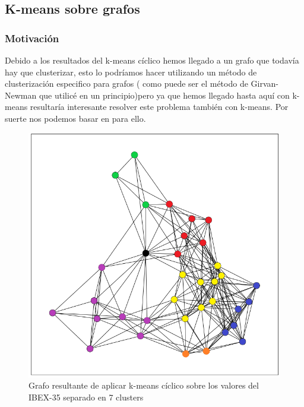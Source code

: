 \documentclass[12pt,a4paper]{article}
\begin{document}
			\subsection{K-means sobre grafos}
			\subsubsection{Motivación}
			Debido a los resultados del k-means cíclico hemos llegado a un grafo que todavía hay que clusterizar, esto lo podríamos hacer utilizando un método de clusterización especifico para grafos ( como puede ser el método de Girvan-Newman que utilicé en un principio)pero ya que hemos llegado hasta aquí con k-means resultaría interesante resolver este problema también con k-means. Por suerte nos podemos basar en \cite{Kmeans} para ello.\\
			 \begin{figure}[H]
\centering
  \centering
  \includegraphics[width=1\linewidth]{kmeans ciclico clusters}
\caption{Grafo resultante de aplicar k-means cíclico sobre los valores del IBEX-35 separado en 7 clusters}
\label{fig:clusters}
\end{figure}
			
\end{document}
